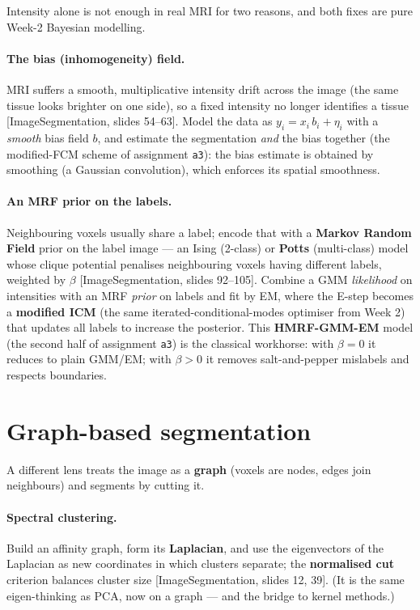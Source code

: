 \documentclass[11pt]{article}
\newcommand{\deck}[1]{\textsf{\small[#1]}}
\begin{document}
Intensity alone is not enough in real MRI for two reasons, and both fixes are
pure Week-2 Bayesian modelling.

\paragraph{The bias (inhomogeneity) field.} MRI suffers a smooth, multiplicative
intensity drift across the image (the same tissue looks brighter on one side),
so a fixed intensity no longer identifies a tissue \deck{ImageSegmentation, slides
54--63}. Model the data as $y_i = x_i\,b_i + \eta_i$ with a \emph{smooth} bias
field $b$, and estimate the segmentation \emph{and} the bias together (the
modified-FCM scheme of assignment \texttt{a3}): the bias estimate is obtained by
smoothing (a Gaussian convolution), which enforces its spatial smoothness.

\paragraph{An MRF prior on the labels.} Neighbouring voxels usually share a label;
encode that with a \textbf{Markov Random Field} prior on the label image ---
an Ising (2-class) or \textbf{Potts} (multi-class) model whose clique potential
penalises neighbouring voxels having different labels, weighted by $\beta$
\deck{ImageSegmentation, slides 92--105}. Combine a GMM \emph{likelihood} on
intensities with an MRF \emph{prior} on labels and fit by EM, where the E-step
becomes a \textbf{modified ICM} (the same iterated-conditional-modes optimiser
from Week 2) that updates all labels to increase the posterior. This
\textbf{HMRF-GMM-EM} model (the second half of assignment \texttt{a3}) is the
classical workhorse: with $\beta=0$ it reduces to plain GMM/EM; with $\beta>0$ it
removes salt-and-pepper mislabels and respects boundaries.

\section{Graph-based segmentation}

A different lens treats the image as a \textbf{graph} (voxels are nodes, edges
join neighbours) and segments by cutting it.

\paragraph{Spectral clustering.} Build an affinity graph, form its
\textbf{Laplacian}, and use the eigenvectors of the Laplacian as new coordinates
in which clusters separate; the \textbf{normalised cut} criterion balances cluster
size \deck{ImageSegmentation, slides 12, 39}. (It is the same eigen-thinking as
PCA, now on a graph --- and the bridge to kernel methods.)
\end{document}
